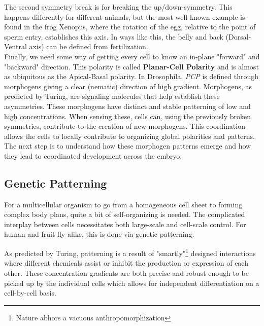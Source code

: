 The second symmetry break is for breaking the up/down-symmetry. This happens differently for different animals, but the most well known example is found in the frog Xenopus, where the rotation of the egg, relative to the point of sperm entry, establishes this axis. In ways like this, the belly and back (Dorsal-Ventral axis) can be defined from fertilization.\\

Finally, we need some way of getting every cell to know an in-plane "forward" and "backward" direction. This polarity is called \textbf{Planar-Cell Polarity} and is almost as ubiquitous as the Apical-Basal polarity. In Drosophila, \textit{PCP} is defined through morphogens giving a clear (nematic) direction of high gradient. Morphogens, as predicted by Turing, are signaling molecules that help establish these asymmetries. These morphogens have distinct and stable patterning of low and high concentrations. When sensing these, cells can, using the previously broken symmetries, contribute to the creation of new morphogens. This coordination allows the cells to locally contribute to organizing global polarities and patterns.\\

The next step is to understand how these morphogen patterns emerge and how they lead to coordinated development across the embryo:



\subsection{Genetic Patterning}
\label{sec:gen_patterns}
For a multicellular organism to go from a homogeneous cell sheet to forming complex body plans, quite a bit of self-organizing is needed. The complicated interplay between cells necessitates both large-scale and cell-scale control. For human and fruit fly alike, this is done via genetic patterning.\cite{veraksa2000developmental}

As predicted by Turing, patterning is a result of "smartly"\footnote{Nature abhors a vacuous anthropomorphization} designed interactions where different chemicals assist or inhibit the production or expression of each other. These concentration gradients are both precise and robust enough to be picked up by the individual cells which allows for independent differentiation on a cell-by-cell basis.\\


